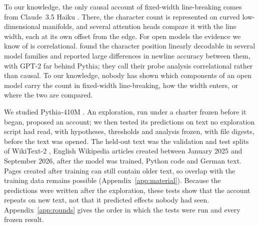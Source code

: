 \documentclass[11pt,a4paper]{article}
\begin{document}
To our knowledge, the only causal account of fixed-width line-breaking comes from Claude~3.5 Haiku \citep{gurnee2026manifolds}. There, the character count is represented on curved low-dimensional manifolds, and several attention heads compare it with the line width, each at its own offset from the edge. For open models the evidence we know of is correlational. \citet{sinii2026counting} found the character position linearly decodable in several model families and reported large differences in newline accuracy between them, with GPT-2 far behind Pythia; they call their probe analysis correlational rather than causal. To our knowledge, nobody has shown which components of an open model carry the count in fixed-width line-breaking, how the width enters, or where the two are compared.

We studied Pythia-410M \citep{biderman2023pythia}. An exploration, run under a charter frozen before it began, proposed an account; we then tested its predictions on text no exploration script had read, with hypotheses, thresholds and analysis frozen, with file digests, before the text was opened. The held-out text was the validation and test splits of WikiText-2 \citep{merity2017pointer}, English Wikipedia articles created between January 2025 and September 2026, after the model was trained, Python code and German text. Pages created after training can still contain older text, so overlap with the training data remains possible (Appendix~\ref{app:material}). Because the predictions were written after the exploration, these tests show that the account repeats on new text, not that it predicted effects nobody had seen. Appendix~\ref{app:rounds} gives the order in which the tests were run and every frozen result.
\end{document}
